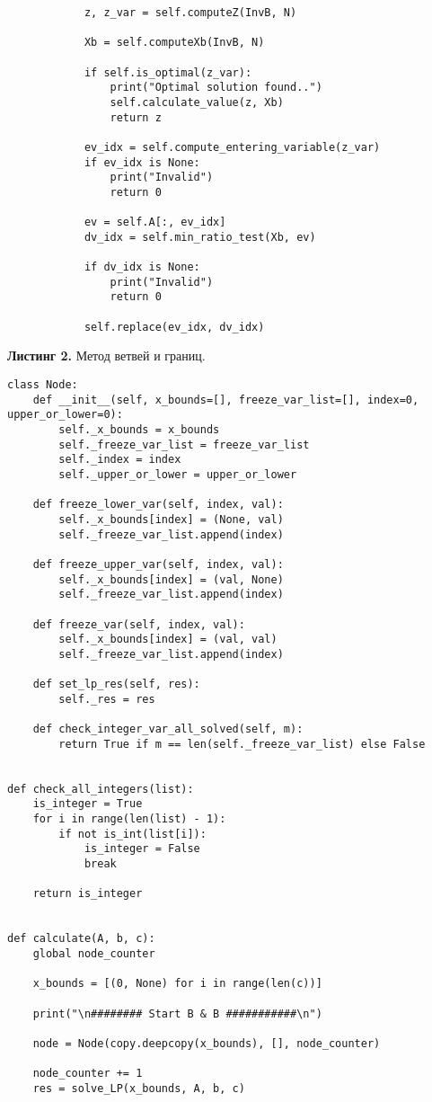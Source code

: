 \documentclass[a4paper, 12pt]{article}   	%
\begin{document}
\begin{verbatim}
			z, z_var = self.computeZ(InvB, N)

			Xb = self.computeXb(InvB, N)

			if self.is_optimal(z_var):
				print("Optimal solution found..")
				self.calculate_value(z, Xb)
				return z

			ev_idx = self.compute_entering_variable(z_var)
			if ev_idx is None:
				print("Invalid")
				return 0

			ev = self.A[:, ev_idx]
			dv_idx = self.min_ratio_test(Xb, ev)

			if dv_idx is None:
				print("Invalid")
				return 0

			self.replace(ev_idx, dv_idx)
    \end{verbatim}

    \textbf{Листинг 2.} Метод ветвей и границ.
    \begin{verbatim}
class Node:
	def __init__(self, x_bounds=[], freeze_var_list=[], index=0, upper_or_lower=0):
		self._x_bounds = x_bounds
		self._freeze_var_list = freeze_var_list
		self._index = index
		self._upper_or_lower = upper_or_lower

	def freeze_lower_var(self, index, val):
		self._x_bounds[index] = (None, val)
		self._freeze_var_list.append(index)

	def freeze_upper_var(self, index, val):
		self._x_bounds[index] = (val, None)
		self._freeze_var_list.append(index)

	def freeze_var(self, index, val):
		self._x_bounds[index] = (val, val)
		self._freeze_var_list.append(index)

	def set_lp_res(self, res):
		self._res = res

	def check_integer_var_all_solved(self, m):
		return True if m == len(self._freeze_var_list) else False


def check_all_integers(list):
	is_integer = True
	for i in range(len(list) - 1):
		if not is_int(list[i]):
			is_integer = False
			break

	return is_integer


def calculate(A, b, c):
	global node_counter

	x_bounds = [(0, None) for i in range(len(c))]

	print("\n######## Start B & B ###########\n")

	node = Node(copy.deepcopy(x_bounds), [], node_counter)

	node_counter += 1
	res = solve_LP(x_bounds, A, b, c)


\end{verbatim}
\end{document}
